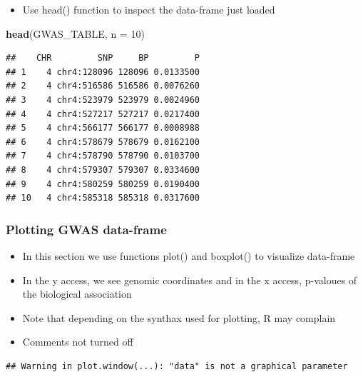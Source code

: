 \documentclass[
]{book}
\newenvironment{Shaded}{\begin{snugshade}}{\end{snugshade}}
\newcommand{\AttributeTok}[1]{\textcolor[rgb]{0.13,0.29,0.53}{#1}}
\newcommand{\DecValTok}[1]{\textcolor[rgb]{0.00,0.00,0.81}{#1}}
\newcommand{\DocumentationTok}[1]{\textcolor[rgb]{0.56,0.35,0.01}{\textbf{\textit{#1}}}}
\newcommand{\FunctionTok}[1]{\textcolor[rgb]{0.13,0.29,0.53}{\textbf{#1}}}
\newcommand{\NormalTok}[1]{#1}
\newcommand{\SpecialCharTok}[1]{\textcolor[rgb]{0.81,0.36,0.00}{\textbf{#1}}}
\providecommand{\tightlist}{%
  \setlength{\itemsep}{0pt}\setlength{\parskip}{0pt}}
\begin{document}
\begin{itemize}
\tightlist
\item
  Use head() function to inspect the data-frame just loaded
\end{itemize}

\begin{Shaded}
\begin{Highlighting}[]
\FunctionTok{head}\NormalTok{(GWAS\_TABLE, }\AttributeTok{n =} \DecValTok{10}\NormalTok{)}
\end{Highlighting}
\end{Shaded}

\begin{verbatim}
##    CHR         SNP     BP         P
## 1    4 chr4:128096 128096 0.0133500
## 2    4 chr4:516586 516586 0.0076260
## 3    4 chr4:523979 523979 0.0024960
## 4    4 chr4:527217 527217 0.0217400
## 5    4 chr4:566177 566177 0.0008988
## 6    4 chr4:578679 578679 0.0162100
## 7    4 chr4:578790 578790 0.0103700
## 8    4 chr4:579307 579307 0.0334600
## 9    4 chr4:580259 580259 0.0190400
## 10   4 chr4:585318 585318 0.0317600
\end{verbatim}

\subsubsection{Plotting GWAS data-frame}\label{plotting-gwas-data-frame}

\begin{itemize}
\item
  In this section we use functions plot() and boxplot() to visualize data-frame
\item
  In the y access, we see genomic coordinates and in the x access, p-valoues of the biological association
\item
  Note that depending on the synthax used for plotting, R may complain
\item
  Comments not turned off
\end{itemize}

\begin{Shaded}
\end{Shaded}

\begin{verbatim}
## Warning in plot.window(...): "data" is not a graphical parameter
\end{verbatim}
\end{document}
